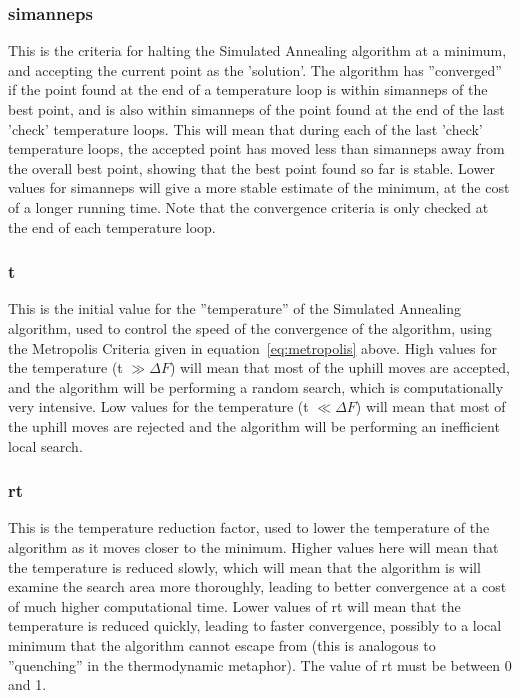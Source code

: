 \documentclass [a4paper, 10pt]{book}
\begin{document}
\subsubsection{simanneps}
This is the criteria for halting the Simulated Annealing algorithm at a minimum, and accepting the current point as the 'solution'.  The algorithm has ''converged'' if the point found at the end of a temperature loop is within simanneps of the best point, and is also within simanneps of the point found at the end of the last 'check' temperature loops.  This will mean that during each of the last 'check' temperature loops, the accepted point has moved less than simanneps away from the overall best point, showing that the best point found so far is stable.  Lower values for simanneps will give a more stable estimate of the minimum, at the cost of a longer running time.  Note that the convergence criteria is only checked at the end of each temperature loop.

\subsubsection{t}
This is the initial value for the ''temperature'' of the Simulated Annealing algorithm, used to control the speed of the convergence of the algorithm, using the Metropolis Criteria given in equation~\ref{eq:metropolis} above.  High values for the temperature (t $\gg \Delta F$) will mean that most of the uphill moves are accepted, and the algorithm will be performing a random search, which is computationally very intensive.  Low values for the temperature (t $\ll \Delta F$) will mean that most of the uphill moves are rejected and the algorithm will be performing an inefficient local search.

\subsubsection{rt}
This is the temperature reduction factor, used to lower the temperature of the algorithm as it moves closer to the minimum.  Higher values here will mean that the temperature is reduced slowly, which will mean that the algorithm is will examine the search area more thoroughly, leading to better convergence at a cost of much higher computational time.  Lower values of rt will mean that the temperature is reduced quickly, leading to faster convergence, possibly to a local minimum that the algorithm cannot escape from (this is analogous to ''quenching'' in the thermodynamic metaphor).  The value of rt must be between 0 and 1.
\end{document}
